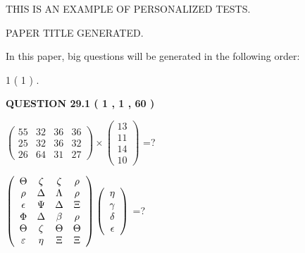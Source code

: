 \documentclass[12pt]{article}
\begin{document}
   
   
   
   
   
   
   
 \vspace{0.2in}
{\Huge  THIS IS AN EXAMPLE OF}
{\Huge  PERSONALIZED TESTS. }
   
   
 PAPER TITLE GENERATED.
   
   
   
\vspace{0.2in}
   
In this paper, big questions will be generated in the following order: 
   
   
             1 (           1 )
 .
  
\vspace{0.2in}
  
{\textbf{\Large{QUESTION
29.1 
 (           1 ,           1 ,          60 )
}}}
  
  
 
$ \left( \begin{array}{ccccccccc}
          55  & 
          32  & 
          36  & 
          36  \\ 
          25  & 
          32  & 
          36  & 
          32  \\ 
          26  & 
          64  & 
          31  & 
          27
\end{array}\right) \times
\left( \begin{array}{c}
          13  \\ 
          11  \\ 
          14  \\ 
          10
\end{array}\right) $ =?
 
 
$  %
 \left( \begin{array}
 {
 c
 c
 c
 c
 }
 \Theta & 
                    \zeta & 
                    \zeta & 
 \rho \\ 
 \rho & 
 \Delta & 
 \Lambda & 
 \rho \\ 
 \epsilon & 
 \Psi & 
 \Delta & 
                    \Xi \\ 
 \Phi & 
 \Delta & 
 \beta & 
 \rho \\ 
 \Theta & 
                    \zeta & 
 \Theta & 
 \Theta \\ 
 \varepsilon & 
 \eta & 
                    \Xi & 
                    \Xi
 \end{array} \right)
 \left( \begin{array}
 {
 c
 }
 \eta \\ 
 \gamma \\ 
 \delta \\ 
 \epsilon
 \end{array} \right)
$ =?
 
\end{document}
